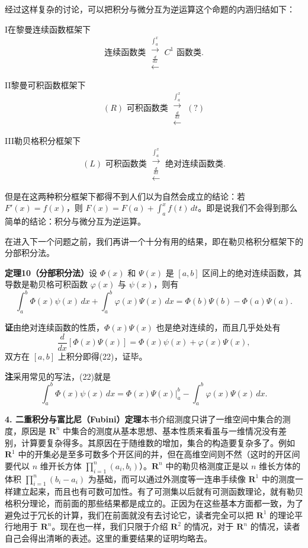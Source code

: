 经过这样复杂的讨论，可以把积分与微分互为逆运算这个命题的内涵归结如下：

I\quad 在黎曼连续函数框架下
\[
 \text{连续函数类}\ \mathrel{\substack{\xrightarrow{\int_a^x}\\[-1.2ex]\xleftarrow{\frac{d}{dx}}}}\ C^1\text{ 函数类}.
\]

II\quad 黎曼可积函数框架下
\[
 (R)\text{ 可积函数类}\ \mathrel{\substack{\xrightarrow{\int_a^x}\\[-1.2ex]\xleftarrow{\frac{d}{dx}}}}\ (?)
\]

III\quad 勒贝格积分框架下
\[
 (L)\text{ 可积函数类}\ \mathrel{\substack{\xrightarrow{\int_a^x}\\[-1.2ex]\xleftarrow{\frac{d}{dx}}}}\ \text{绝对连续函数类}.
\]

但是在这两种积分框架下都得不到人们以为自然会成立的结论：若 $F'(x)=f(x)$，则 $F(x)=F(a)+\int_a^x f(t)\,dt$。即是说我们不会得到那么简单的结论：积分与微分互为逆运算。

在进入下一个问题之前，我们再讲一个十分有用的结果，即在勒贝格积分框架下的分部积分法。

\noindent\textbf{定理10（分部积分法）}\quad 设 $\Phi(x)$ 和 $\Psi(x)$ 是 $[a,b]$ 区间上的绝对连续函数，其导数是勒贝格可积函数 $\varphi(x)$ 与 $\psi(x)$，则有
\begin{equation}
 \int_a^b\Phi(x)\psi(x)\,dx+\int_a^b\varphi(x)\Psi(x)\,dx
 =\Phi(b)\Psi(b)-\Phi(a)\Psi(a).
 \tag{22}
\end{equation}

\noindent\textbf{证}\quad 由绝对连续函数的性质，$\Phi(x)\Psi(x)$ 也是绝对连续的，而且几乎处处有
\[
 \frac{d}{dx}[\Phi(x)\Psi(x)]=\Phi(x)\psi(x)+\varphi(x)\Psi(x),
\]
双方在 $[a,b]$ 上积分即得(22)，证毕。

\noindent\textbf{注}\quad 采用常见的写法，(22)就是
\begin{equation}
 \int_a^b\Phi(x)\psi(x)\,dx
 =\left.\Phi(x)\Psi(x)\right|_a^b-\int_a^b\varphi(x)\Psi(x)\,dx.
 \tag{23}
\end{equation}

\medskip
\noindent\textbf{4. 二重积分与富比尼（Fubini）定理}\quad 本书介绍测度只讲了一维空间中集合的测度，原因是 $\mathbf R^n$ 中集合的测度从基本思想、基本性质来看虽与一维情况没有差别，计算要复杂得多。其原因在于随维数的增加，集合的构造要复杂多了。例如 $\mathbf R^1$ 中的开集必是至多可数多个开区间的并，但在高维空间则不然（这时的开区间要代以 $n$ 维开长方体 $\prod_{i=1}^n(a_i,b_i)$）。$\mathbf R^n$ 中的勒贝格测度正是以 $n$ 维长方体的体积 $\prod_{i=1}^n(b_i-a_i)$ 为基础，而可以通过外测度等一连串手续像 $\mathbf R^1$ 中的测度一样建立起来，而且也有可数可加性。有了可测集以后就有可测函数理论，就有勒贝格积分理论，而前面的那些结果都是成立的。正因为在这些基本方面都一致，为了避免过于冗长的计算，我们在前面就没有去讨论它，读者完全可以把 $\mathbf R^1$ 的理论平行地用于 $\mathbf R^n$。现在也一样，我们只限于介绍 $\mathbf R^2$ 的情况，对于 $\mathbf R^n$ 的情况，读者自己会得出清晰的表述。这里的重要结果的证明均略去。

